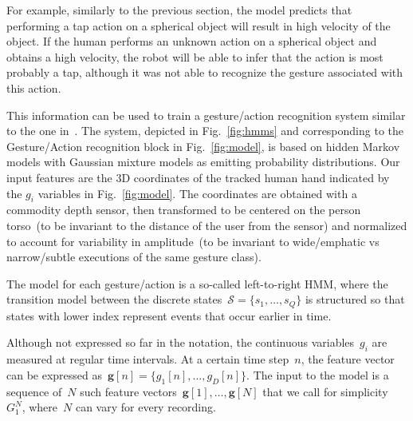 For example, similarly to the previous section, the \AffWords{} model predicts that performing a tap action on a spherical object will result in high velocity of the object.
If the human performs an unknown action on a spherical object and obtains a high velocity, the robot will be able to infer that the action is most probably a tap, although it was not able to recognize the gesture associated with this action.

This information can be used to train a gesture/action recognition system similar to the one in~\cite{saponaro:2013:crhri}.
The system, depicted in Fig.~\ref{fig:hmms} and corresponding to the Gesture/Action recognition block in Fig.~\ref{fig:model}, is based on hidden Markov models with Gaussian mixture models as emitting probability distributions.
Our input features are the 3D coordinates of the tracked human hand indicated by the $g_i$ variables in Fig.~\ref{fig:model}.
The coordinates are obtained with a commodity depth sensor, then transformed to be centered on the person torso~(to be invariant to the distance of the user from the sensor) and normalized to account for variability in amplitude~(to be invariant to wide/emphatic vs narrow/subtle executions of the same gesture class).

The model for each gesture/action is a so-called left-to-right \ac{HMM}, where the transition model between the discrete states~$\mathcal{S} = \{s_1, \dots, s_Q\}$ is structured so that states with lower index represent events that occur earlier in time.

Although not expressed so far in the notation, the continuous variables~$g_i$ are measured at regular time intervals.
At a certain time step~$n$, the feature vector can be expressed as~$\mathbf{g}[n] = \{g_1[n], \dots, g_D[n]\}$.
The input to the model is a sequence of~$N$ such feature vectors~$\mathbf{g}[1], \dots, \mathbf{g}[N]$ that we call for simplicity~$G_1^N$, where~$N$ can vary for every recording.

